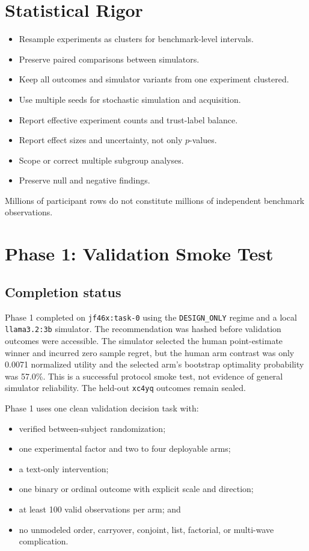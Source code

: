 \documentclass[11pt]{article}
\begin{document}
\section{Statistical Rigor}

\begin{itemize}
\item Resample experiments as clusters for benchmark-level intervals.
\item Preserve paired comparisons between simulators.
\item Keep all outcomes and simulator variants from one experiment clustered.
\item Use multiple seeds for stochastic simulation and acquisition.
\item Report effective experiment counts and trust-label balance.
\item Report effect sizes and uncertainty, not only $p$-values.
\item Scope or correct multiple subgroup analyses.
\item Preserve null and negative findings.
\end{itemize}

Millions of participant rows do not constitute millions of independent benchmark observations.

\section{Phase 1: Validation Smoke Test}

\subsection*{Completion status}

Phase 1 completed on \texttt{jf46x:task-0} using the \texttt{DESIGN\_ONLY} regime and a local \texttt{llama3.2:3b} simulator. The recommendation was hashed before validation outcomes were accessible. The simulator selected the human point-estimate winner and incurred zero sample regret, but the human arm contrast was only 0.0071 normalized utility and the selected arm's bootstrap optimality probability was 57.0\%. This is a successful protocol smoke test, not evidence of general simulator reliability. The held-out \texttt{xc4yq} outcomes remain sealed.

Phase 1 uses one clean validation decision task with:

\begin{itemize}
\item verified between-subject randomization;
\item one experimental factor and two to four deployable arms;
\item a text-only intervention;
\item one binary or ordinal outcome with explicit scale and direction;
\item at least 100 valid observations per arm; and
\item no unmodeled order, carryover, conjoint, list, factorial, or multi-wave complication.
\end{itemize}
\end{document}
